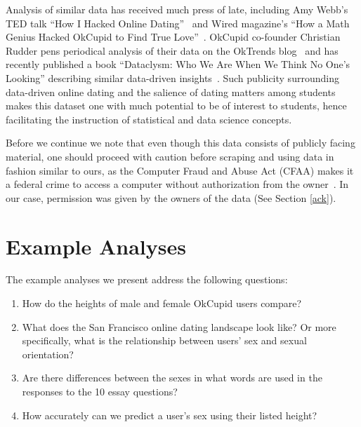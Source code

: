 \documentclass{article}\usepackage[]{graphicx}\usepackage[]{color}
\begin{document}
Analysis of similar data has received much press of late, including Amy Webb's TED talk ``How I Hacked Online Dating''~\cite{TED} and Wired magazine's ``How a Math Genius Hacked OkCupid to Find True Love''~\cite{Wired}.  OkCupid co-founder Christian Rudder pens periodical analysis of their data on the OkTrends blog~\cite{OkTrends} and has recently published a book ``Dataclysm: Who We Are When We Think No One's Looking'' describing similar data-driven insights~\cite{dataclysm}.  Such publicity surrounding data-driven online dating and the salience of dating matters among students makes this dataset one with much potential to be of interest to students, hence facilitating the instruction of statistical and data science concepts.

Before we continue we note that even though this data consists of publicly facing material, one should proceed with caution before scraping and using data in fashion similar to ours, as the Computer Fraud and Abuse Act (CFAA) makes it a federal crime to access a computer without authorization from the owner~\cite{pando}.  In our case, permission was given by the owners of the data (See Section \ref{ack}).










%
\section{Example Analyses}\label{analyses}
%
The example analyses we present address the following questions:

\begin{enumerate}
\item How do the heights of male and female OkCupid users compare?
\item What does the San Francisco online dating landscape look like?  Or more specifically, what is the relationship between users' sex and sexual orientation?
\item Are there differences between the sexes in what words are used in the responses to the 10 essay questions?
\item How accurately can we predict a user's sex using their listed height?
\end{enumerate}
\end{document}
